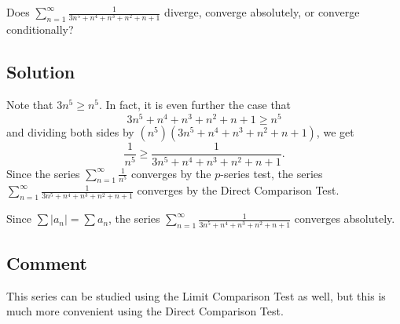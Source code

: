 \documentclass{article}
\begin{document}
\noindent
Does $\displaystyle \sum_{n=1}^\infty \frac{1}{3n^5+n^4+n^3+n^2+n+1}$
diverge, converge absolutely, or converge conditionally?

\subsection*{Solution}

Note that $3n^5 \geq n^5$. In fact, it is even further the case that
\[3n^5+n^4+n^3+n^2+n+1 \geq n^5\]
and dividing both sides by $(n^5)(3n^5+n^4+n^3+n^2+n+1)$, we get
\[ \frac1{n^5} \geq \frac{1}{3n^5+n^4+n^3+n^2+n+1}.\]
Since the series $\displaystyle \sum_{n=1}^\infty \frac1{n^5}$ converges by the $p$-series test, the series $\displaystyle \sum_{n=1}^\infty \frac{1}{3n^5+n^4+n^3+n^2+n+1}$ converges by the Direct Comparison Test.

Since $\sum |a_n| = \sum a_n$, the series $\displaystyle \sum_{n=1}^\infty \frac{1}{3n^5+n^4+n^3+n^2+n+1}$ converges absolutely.

\subsection*{Comment}

This series can be studied using the Limit Comparison Test as well, but this is much more convenient using the Direct Comparison Test.
\end{document}
